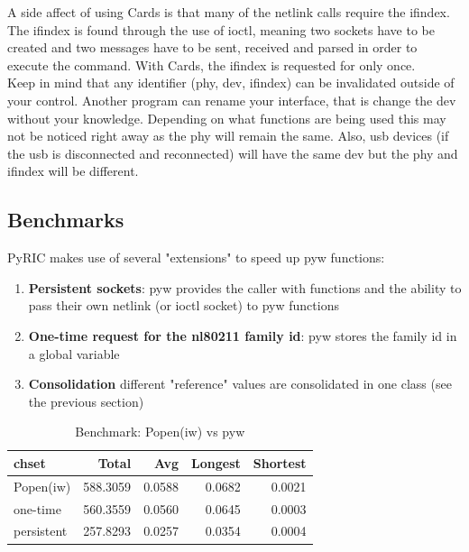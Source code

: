 \documentclass[11pt]{article}
\begin{document}
A side affect of using Cards is that many of the netlink calls require the ifindex.
The ifindex is found through the use of ioctl, meaning two sockets have to be 
created and two messages have to be sent, received and parsed in order to execute
the command. With Cards, the ifindex is requested for only once. \\

Keep in mind that any identifier (phy, dev, ifindex) can be invalidated outside 
of your control. Another program can rename your interface, that is change the 
dev without your knowledge. Depending on what functions are being used this may 
not be noticed right away as the phy will remain the same. Also, usb devices (if 
the usb is disconnected and reconnected) will have the same dev but the phy and 
ifindex will be different.

\subsection{Benchmarks}
PyRIC makes use of several "extensions" to speed up pyw functions:
\begin{enumerate}
\item \textbf{Persistent sockets}: pyw provides the caller with functions and 
the ability to pass their own netlink (or ioctl socket) to pyw functions
\item \textbf{One-time request for the nl80211 family id}: pyw stores the family
id in a global variable
\item \textbf{Consolidation} different "reference" values are consolidated in one
class (see the previous section)
\end{enumerate}

\begin{table}
\begin{center}
\begin{tabular}{| l | r | r | r | r|}
\hline
chset & Total & Avg & Longest & Shortest \\
\hline
Popen(iw) & 588.3059 & 0.0588 & 0.0682 & 0.0021 \\
\hline
one-time & 560.3559 & 0.0560 & 0.0645 & 0.0003 \\
\hline
persistent & 257.8293 & 0.0257 & 0.0354 & 0.0004 \\
\hline
\end{tabular}
\caption{Benchmark: Popen(iw) vs pyw} 
\end{center}
\label{tab:benchmark}
\end{table}
\end{document}
